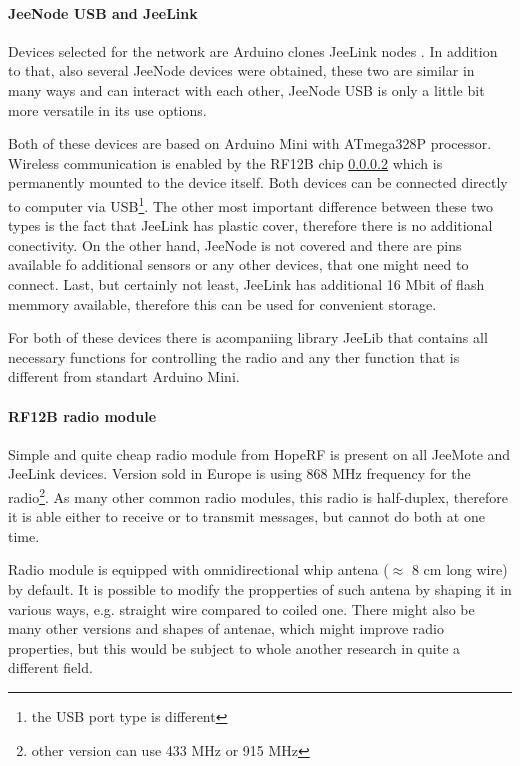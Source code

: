 \documentclass[
  digital, %
  table,   %
  nolof,     %
  nolot,     %
           oneside
]{fithesis3}
\begin{document}
  \paragraph{JeeNode USB and JeeLink}\label{par:jeeLink} %
  Devices selected for the network are Arduino clones JeeLink nodes \cite{JeeLink}. In addition to that, also several JeeNode devices \cite{JeeNode} were obtained, these two are similar in many ways and can interact with each other, JeeNode USB is only a little bit more versatile in its use options.

  Both of these devices are based on Arduino Mini \cite{ArduinoMini}
  with ATmega328P processor. Wireless communication is enabled by the RF12B chip \ref{par:radio} \cite{RF12B}
  which is permanently mounted to the device itself. Both devices can be connected directly to computer via USB\footnote{the USB port type is different}. The other most important difference between these two types is the fact that JeeLink has plastic cover, therefore there is no additional conectivity. On the other hand, JeeNode is not covered and there are pins available fo additional sensors or any other devices, that one might need to connect. Last, but certainly not least, JeeLink has additional 16 Mbit of flash memmory \cite{JeeLink}
  available, therefore this can be used for convenient storage.

  For both of these devices there is acompaniing library JeeLib \cite{JeeLib}
  that contains all necessary functions for controlling the radio and any ther function that is different from standart Arduino Mini.
  \paragraph{RF12B radio module}\label{par:radio} %
  Simple and quite cheap radio module from HopeRF \cite{RF12B}
  is present on all JeeMote and JeeLink devices. Version sold in Europe is using 868 MHz frequency for the radio\footnote{other version can use 433 MHz or 915 MHz}. As many other common radio modules, this radio is half-duplex, therefore it is able either to receive or to transmit messages, but cannot do both at one time.

  Radio module is equipped with omnidirectional whip antena ($\approx$ 8 cm long wire) by default. It is possible to modify the propperties of such antena by shaping it in various ways, e.g. straight wire compared to coiled one. There might also be many other versions and shapes of antenae, which might improve radio properties, but this would be subject to whole another research in quite a different field.
\end{document}
